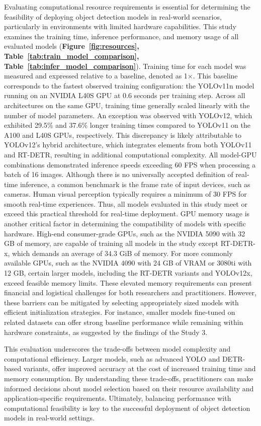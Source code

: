 Evaluating computational resource requirements is essential for determining the feasibility of deploying object detection models in real-world scenarios, particularly in environments with limited hardware capabilities. This study examines the training time, inference performance, and memory usage of all evaluated models (\textbf{Figure~\ref{fig:resources}, Table~\ref{tab:train_model_comparison}, Table~\ref{tab:infer_model_comparison}}).
Training time for each model was measured and expressed relative to a baseline, denoted as 1×. This baseline corresponds to the fastest observed training configuration: the YOLOv11n model running on an NVIDIA L40S GPU at 0.6 seconds per training step. Across all architectures on the same GPU, training time generally scaled linearly with the number of model parameters. An exception was observed with YOLOv12, which exhibited 29.5\% and 37.6\% longer training times compared to YOLOv11 on the A100 and L40S GPUs, respectively. This discrepancy is likely attributable to YOLOv12’s hybrid architecture, which integrates elements from both YOLOv11 and RT-DETR, resulting in additional computational complexity.
All model-GPU combinations demonstrated inference speeds exceeding 60 FPS when processing a batch of 16 images. Although there is no universally accepted definition of real-time inference, a common benchmark is the frame rate of input devices, such as cameras. Human visual perception typically requires a minimum of 30 FPS for smooth real-time experiences. Thus, all models evaluated in this study meet or exceed this practical threshold for real-time deployment.
GPU memory usage is another critical factor in determining the compatibility of models with specific hardware. High-end consumer-grade GPUs, such as the NVIDIA 5090 with 32 GB of memory, are capable of training all models in the study except RT-DETR-x, which demands an average of 34.3 GiB of memory. For more commonly available GPUs, such as the NVIDIA 4090 with 24 GB of VRAM or 3080ti with 12 GB, certain larger models, including the RT-DETR variants and YOLOv12x, exceed feasible memory limits. These elevated memory requirements can present financial and logistical challenges for both researchers and practitioners. However, these barriers can be mitigated by selecting appropriately sized models with efficient initialization strategies. For instance, smaller models fine-tuned on related datasets can offer strong baseline performance while remaining within hardware constraints, as suggested by the findings of the Study 3.

This evaluation underscores the trade-offs between model complexity and computational efficiency. Larger models, such as advanced YOLO and DETR-based variants, offer improved accuracy at the cost of increased training time and memory consumption. By understanding these trade-offs, practitioners can make informed decisions about model selection based on their resource availability and application-specific requirements. Ultimately, balancing performance with computational feasibility is key to the successful deployment of object detection models in real-world settings.

